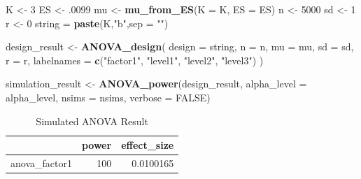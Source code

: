 \documentclass[]{book}
\newenvironment{Shaded}{\begin{snugshade}}{\end{snugshade}}
\newcommand{\DataTypeTok}[1]{\textcolor[rgb]{0.13,0.29,0.53}{#1}}
\newcommand{\DecValTok}[1]{\textcolor[rgb]{0.00,0.00,0.81}{#1}}
\newcommand{\FloatTok}[1]{\textcolor[rgb]{0.00,0.00,0.81}{#1}}
\newcommand{\KeywordTok}[1]{\textcolor[rgb]{0.13,0.29,0.53}{\textbf{#1}}}
\newcommand{\NormalTok}[1]{#1}
\newcommand{\OtherTok}[1]{\textcolor[rgb]{0.56,0.35,0.01}{#1}}
\newcommand{\StringTok}[1]{\textcolor[rgb]{0.31,0.60,0.02}{#1}}
\begin{document}
\begin{Shaded}
\begin{Highlighting}[]
\NormalTok{K <-}\StringTok{ }\DecValTok{3}
\NormalTok{ES <-}\StringTok{ }\FloatTok{.0099}
\NormalTok{mu <-}\StringTok{ }\KeywordTok{mu_from_ES}\NormalTok{(}\DataTypeTok{K =}\NormalTok{ K, }\DataTypeTok{ES =}\NormalTok{ ES)}
\NormalTok{n <-}\StringTok{ }\DecValTok{5000}
\NormalTok{sd <-}\StringTok{ }\DecValTok{1}
\NormalTok{r <-}\StringTok{ }\DecValTok{0}
\NormalTok{string =}\StringTok{ }\KeywordTok{paste}\NormalTok{(K,}\StringTok{"b"}\NormalTok{,}\DataTypeTok{sep =} \StringTok{""}\NormalTok{)}
\end{Highlighting}
\end{Shaded}

\begin{Shaded}
\begin{Highlighting}[]
\NormalTok{design_result <-}\StringTok{ }\KeywordTok{ANOVA_design}\NormalTok{(}
  \DataTypeTok{design =}\NormalTok{ string,}
  \DataTypeTok{n =}\NormalTok{ n,}
  \DataTypeTok{mu =}\NormalTok{ mu,}
  \DataTypeTok{sd =}\NormalTok{ sd,}
  \DataTypeTok{r =}\NormalTok{ r,}
  \DataTypeTok{labelnames =} \KeywordTok{c}\NormalTok{(}\StringTok{"factor1"}\NormalTok{, }\StringTok{"level1"}\NormalTok{, }\StringTok{"level2"}\NormalTok{, }\StringTok{"level3"}\NormalTok{)}
\NormalTok{  )}
\end{Highlighting}
\end{Shaded}

\begin{Shaded}
\begin{Highlighting}[]
\NormalTok{simulation_result <-}\StringTok{ }\KeywordTok{ANOVA_power}\NormalTok{(design_result, }
                                 \DataTypeTok{alpha_level =}\NormalTok{ alpha_level, }
                                 \DataTypeTok{nsims =}\NormalTok{ nsims,}
                                 \DataTypeTok{verbose =} \OtherTok{FALSE}\NormalTok{)}
\end{Highlighting}
\end{Shaded}

\begin{table}[t]

\caption{\label{tab:unnamed-chunk-78}Simulated ANOVA Result}
\centering
\begin{tabular}{l|r|r}
\hline
  & power & effect\_size\\
\hline
anova\_factor1 & 100 & 0.0100165\\
\hline
\end{tabular}
\end{table}
\end{document}
